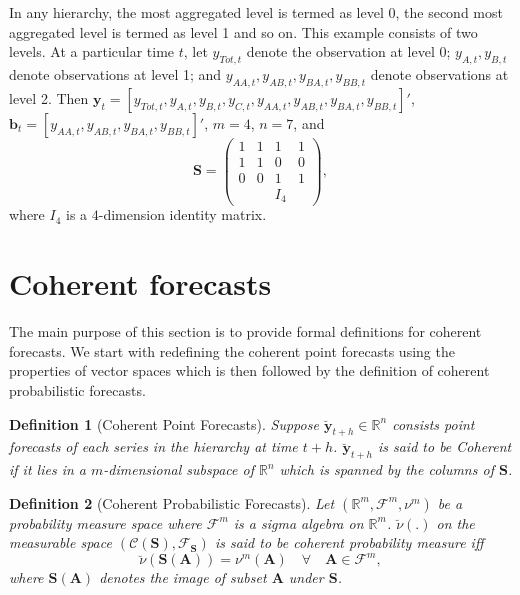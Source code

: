 \documentclass[a4paper, 11pt]{article}
\newtheorem{definition}{Definition}[section]
\begin{document}
In any hierarchy, the most aggregated level is termed as level 0, the second most aggregated level is termed as level 1 and so on. This example consists of two levels. At a particular time $t$, let $y_{Tot,t}$ denote the observation at level 0; $y_{A,t}, y_{B,t} $ denote observations at level 1; and $y_{AA,t}, y_{AB,t}, y_{BA,t}, y_{BB,t}$ denote observations at level 2. Then
$\bm{y}_t = [y_{Tot,t},y_{A,t}, y_{B,t},y_{C,t},y_{AA,t}, y_{AB,t}, y_{BA,t}, y_{BB,t}]'$, \\
$\bm{b}_t = [y_{AA,t}, y_{AB,t}, y_{BA,t}, y_{BB,t}]'$, $m=4$, $n=7$, and
$$
  \bm{S} =
  \begin{pmatrix}
    1& 1 &1 &1  \\ 1 &1 & 0 &0 \\   0&0  & 1 & 1 \\ & & I_4 &
  \end{pmatrix},
$$
where $I_4$ is a $4$-dimension identity matrix.

\section{Coherent forecasts}

The main purpose of this section is to provide formal definitions for coherent forecasts. We start with redefining the coherent point forecasts using the properties of vector spaces which is then followed by the definition of coherent probabilistic forecasts.

\begin{definition}[Coherent Point Forecasts]
Suppose $\breve{\bm{y}}_{t+h} \in \mathbb{R}^n$ consists point forecasts of each series in the hierarchy at time $t+h$.  $\breve{\bm{y}}_{t+h}$ is said to be \textit{Coherent} if it lies in a $m$-dimensional subspace of $\mathbb{R}^n$ which is spanned by the columns of $\bm{S}$.
\end{definition}

\begin{definition}[Coherent Probabilistic Forecasts]\label{def:cohprob}
Let $(\mathbb{R}^m, \bm{\mathscr{F}}^m, \nu^m)$ be a probability measure space where $\mathscr{F}^m$ is a sigma algebra on $\mathbb{R}^m$. $\breve{\nu}(.)$ on the measurable space $(\mathscr{C}(\bm{S}), \mathscr{F}_{\bm{S}})$ is said to be coherent probability measure iff $$\breve{\nu}(\bm{S}(\bm{A})) = \nu^m(\bm{A}) \quad \forall \quad \bm{A} \in \mathscr{F}^m,$$ where $\bm{S}(\bm{A})$ denotes the image of subset $\bm{A}$ under $\bm{S}$.
\end{definition}
\end{document}
